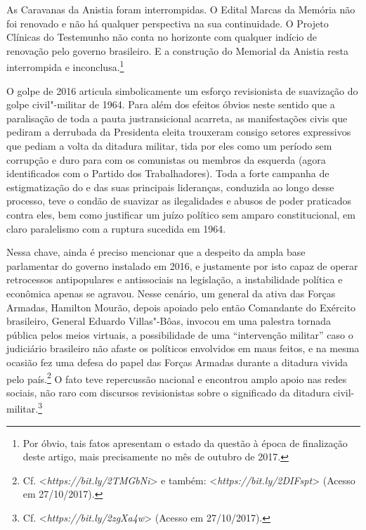 As Caravanas da Anistia foram interrompidas. O Edital Marcas da Memória
não foi renovado e não há qualquer perspectiva na sua continuidade. O
Projeto Clínicas do Testemunho não conta no horizonte com qualquer
indício de renovação pelo governo brasileiro. E a construção do Memorial
da Anistia resta interrompida e inconclusa.\footnote{Por óbvio, tais
  fatos apresentam o estado da questão à época de finalização deste
  artigo, mais precisamente no mês de outubro de 2017.}

O golpe de 2016 articula simbolicamente um esforço revisionista de
suavização do golpe civil"-militar de 1964. Para além dos efeitos óbvios
neste sentido que a paralisação de toda a pauta justransicional
acarreta, as manifestações civis que pediram a derrubada da Presidenta
eleita trouxeram consigo setores expressivos que pediam a volta da
ditadura militar, tida por eles como um período sem corrupção e duro
para com os comunistas ou membros da esquerda (agora identificados com o
Partido dos Trabalhadores). Toda a forte campanha de estigmatização do
 e das suas principais lideranças, conduzida ao longo desse processo,
teve o condão de suavizar as ilegalidades e abusos de poder praticados
contra eles, bem como justificar um juízo político sem amparo
constitucional, em claro paralelismo com a ruptura sucedida em 1964.

Nessa chave, ainda é preciso mencionar que a despeito da ampla base
parlamentar do governo instalado em 2016, e justamente por isto capaz de
operar retrocessos antipopulares e antissociais na legislação, a
instabilidade política e econômica apenas se agravou. Nesse cenário, um
general da ativa das Forças Armadas, Hamilton Mourão, depois apoiado
pelo então Comandante do Exército brasileiro, General Eduardo
Villas"-Bôas, invocou em uma palestra tornada pública pelos meios
virtuais, a possibilidade de uma ``intervenção militar'' caso o judiciário
brasileiro não afaste os políticos envolvidos em maus feitos, e na mesma
ocasião fez uma defesa do papel das Forças Armadas durante a ditadura
vivida pelo país.\footnote{Cf. \textless{}\emph{https://bit.ly/2TMGbNi}\textgreater{}
  e também: \textless{}\emph{https://bit.ly/2DIFspt}\textgreater{}
  (Acesso em 27/10/2017).} O fato teve repercussão nacional e encontrou
amplo apoio nas redes sociais, não raro com discursos revisionistas
sobre o significado da ditadura civil-militar.\footnote{Cf.
\textless{}\emph{https://bit.ly/2zgXa4w}\textgreater{}
  (Acesso em 27/10/2017).}

